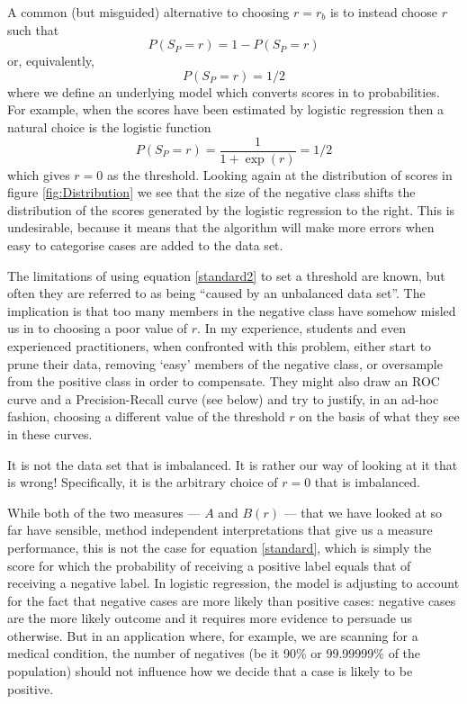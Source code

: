 \documentclass[preprint,12pt]{elsarticle}
\begin{document}
A common (but misguided) alternative to choosing $r=r_b$ is to instead choose $r$ such that
 \begin{equation}
P(S_P = r) = 1 - P(S_P=r) \label{standard}
\end{equation}
or, equivalently,
\begin{equation}
P(S_P = r) = 1/2 \label{standard2}
\end{equation}
where we define an underlying model which converts scores in to probabilities. For example, when the scores have been estimated by logistic regression then a natural choice is the logistic function
\[
P(S_P = r) = \frac{1}{1+\exp(r)} = 1/2
\] 
which gives $r=0$ as the threshold. Looking again at the distribution of scores in figure \ref{fig:Distribution}  we see that the size of the negative class shifts the distribution of the scores generated by the logistic regression to the right. This is undesirable, because it means that the algorithm will make more errors when easy to categorise cases are added to the data set.

The limitations of using equation \ref{standard2} to set a threshold are known, but often they are referred to as being ``caused by an unbalanced data set''. The implication is that too many members in the negative class have somehow misled us in to choosing a poor value of $r$. In my experience, students and even experienced practitioners, when confronted with this problem, either start to prune their data, removing `easy' members of the negative class, or oversample from the positive class in order to compensate. They might also draw an ROC curve and a Precision-Recall curve (see below) and try to justify, in an ad-hoc fashion, choosing a different value of the threshold $r$ on the basis of what they see in these curves.

It is not the data set that is imbalanced. It is rather our way of looking at it that is wrong! Specifically, it is the arbitrary choice of $r=0$ that is imbalanced. 

While both of the two measures --- $A$ and $B(r)$ --- that we have looked at so far have sensible, method independent interpretations that give us a measure performance, this is not the case for equation \ref{standard}, which is simply the score for which the probability of receiving a positive label equals that of receiving a negative label. In logistic regression, the model is adjusting to account for the fact that negative cases are more likely than positive cases: negative cases are the more likely outcome and it requires more evidence to persuade us otherwise. But in an application where, for example, we are scanning for a medical condition, the number of negatives (be it 90\% or 99.99999\% of the population) should not influence how we decide that a case is likely to be positive. 
\end{document}
